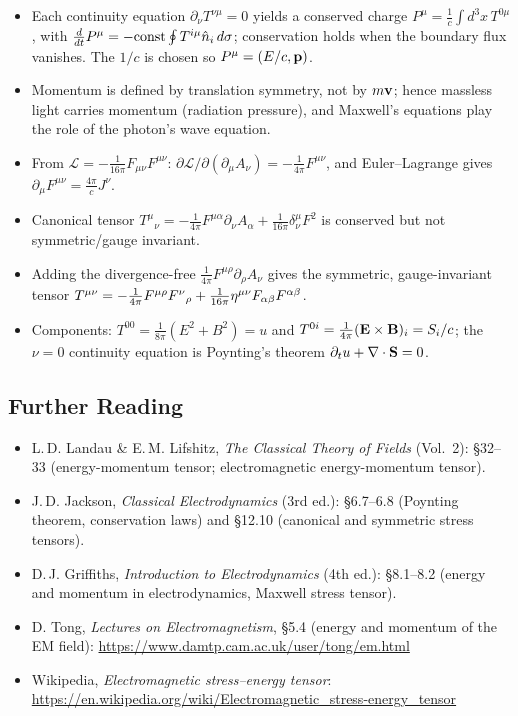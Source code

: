 \begin{itemize}
  \item Each continuity equation $\partial_\nu T^{\nu\mu}=0$ yields a conserved charge
        $P^\mu=\tfrac1c\int d^3x\,T^{0\mu}$, with
        $\frac{d}{dt} P^\mu=-\text{const}\oint T^{i\mu}\hat n_i\,d\sigma$; conservation holds when
        the boundary flux vanishes. The $1/c$ is chosen so $P^\mu=(E/c,\mathbf{p})$.
  \item Momentum is defined by translation symmetry, not by $m\mathbf{v}$; hence massless light
        carries momentum (radiation pressure), and Maxwell's equations play the role of the
        photon's wave equation.
  \item From $\mathcal L=-\tfrac{1}{16\pi}F_{\mu\nu}F^{\mu\nu}$:
        $\partial\mathcal L/\partial(\partial_\mu A_\nu)=-\tfrac{1}{4\pi}F^{\mu\nu}$, and
        Euler--Lagrange gives $\partial_\mu F^{\mu\nu}=\tfrac{4\pi}{c}J^\nu$.
  \item Canonical tensor
        $T^\mu{}_\nu=-\tfrac{1}{4\pi}F^{\mu\alpha}\partial_\nu A_\alpha
        +\tfrac{1}{16\pi}\delta^\mu_\nu F^2$ is conserved but not symmetric/gauge invariant.
  \item Adding the divergence-free $\tfrac{1}{4\pi}F^{\mu\rho}\partial_\rho A_\nu$ gives the
        symmetric, gauge-invariant tensor
        $T^{\mu\nu}=-\tfrac{1}{4\pi}F^{\mu\rho}F^{\nu}{}_{\rho}
        +\tfrac{1}{16\pi}\eta^{\mu\nu}F_{\alpha\beta}F^{\alpha\beta}$.
  \item Components: $T^{00}=\tfrac{1}{8\pi}(E^2+B^2)=u$ and
        $T^{0i}=\tfrac{1}{4\pi}(\mathbf{E}\times\mathbf{B})_i=S_i/c$; the $\nu=0$ continuity equation is
        Poynting's theorem $\partial_t u+\nabla \cdot\mathbf{S}=0$.
\end{itemize}

\subsection*{Further Reading}
\begin{itemize}
  \item L.\,D. Landau \& E.\,M. Lifshitz, \textit{The Classical Theory of Fields}
        (Vol.~2): §32--33 (energy-momentum tensor; electromagnetic energy-momentum tensor).
  \item J.\,D. Jackson, \textit{Classical Electrodynamics} (3rd ed.): §6.7--6.8 (Poynting
        theorem, conservation laws) and §12.10 (canonical and symmetric stress tensors).
  \item D.\,J. Griffiths, \textit{Introduction to Electrodynamics} (4th ed.): §8.1--8.2
        (energy and momentum in electrodynamics, Maxwell stress tensor).
  \item D. Tong, \textit{Lectures on Electromagnetism}, §5.4 (energy and momentum of the
        EM field): \url{https://www.damtp.cam.ac.uk/user/tong/em.html}
  \item Wikipedia, \textit{Electromagnetic stress--energy tensor}:
        \url{https://en.wikipedia.org/wiki/Electromagnetic_stress-energy_tensor}
\end{itemize}
